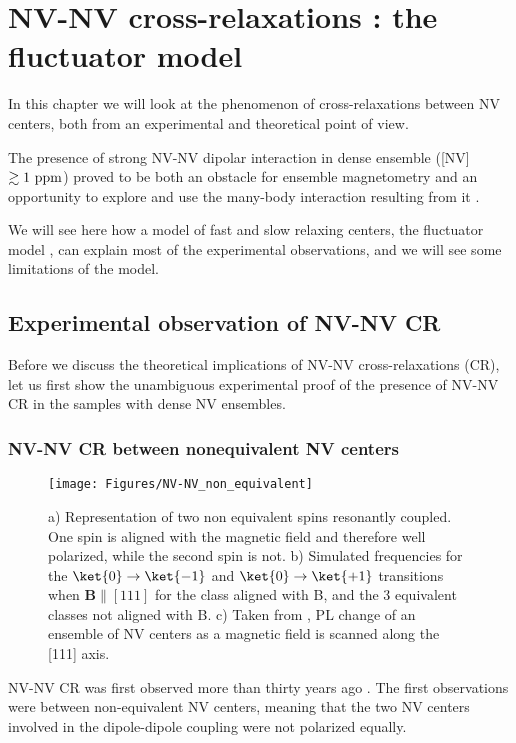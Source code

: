 \documentclass[a4paper,11pt]{report}
\title{}
\begin{document}
\chapter{NV-NV cross-relaxations : the fluctuator model}
In this chapter we will look at the phenomenon of cross-relaxations between NV centers, both from an experimental and theoretical point of view. 

The presence of strong NV-NV dipolar interaction in dense ensemble ([NV] $\gtrsim 1\ \rm ppm$) proved to be both an obstacle for ensemble magnetometry \citep{zhou2020quantum} and an opportunity to explore and use the many-body interaction resulting from it \citep{zhou2020quantum, choi2017observation, kucsko2018critical, zu2021emergent}.

We will see here how a model of fast and slow relaxing centers, the fluctuator model \citep{choi2017depolarization}, can explain most of the experimental observations, and we will see some limitations of the model.

\section{Experimental observation of NV-NV CR}
Before we discuss the theoretical implications of NV-NV cross-relaxations (CR), let us first show the unambiguous experimental proof of the presence of NV-NV CR in the samples with dense NV ensembles.
\subsection{NV-NV CR between nonequivalent NV centers}
\label{non_equi_valent_CR}
\begin{figure}[h]
\centering
\texttt{[image: Figures/NV-NV\_non\_equivalent]}
\caption{a) Representation of two non equivalent spins resonantly coupled. One spin is aligned with the magnetic field and therefore well polarized, while the second spin is not. b) Simulated frequencies for the $\ket{0} \to \ket{-1}$ and $\ket{0} \to \ket{+1}$ transitions when $\mathbf{B}\parallel [111]$ for the class aligned with B, and the 3 equivalent classes not aligned with B. c) Taken from \citep{armstrong2010nv}, PL change of an ensemble of NV centers as a magnetic field is scanned along the [111] axis.}
\label{non equivalent NV-NV}
\end{figure}
NV-NV CR was first observed more than thirty years ago \citep{holliday1989optical, van1989cross}. The first observations were between non-equivalent NV centers, meaning that the two NV centers involved in the dipole-dipole coupling were not polarized equally.
\end{document}
